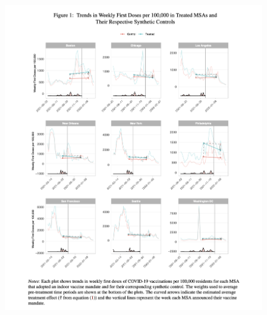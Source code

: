 \documentclass{beamer}
\begin{document}
\begin{frame}[plain]

	\begin{figure}
	\includegraphics[scale=0.3]{./lecture_includes/vitor_figure1}
	\end{figure}

\end{frame}
\end{document}
